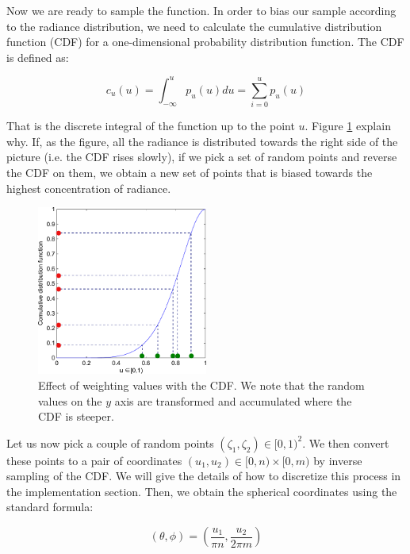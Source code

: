 Now we are ready to sample the function. In order to bias our sample according to the radiance distribution, we need to calculate the cumulative distribution function (CDF) for a one-dimensional probability distribution function. The CDF is defined as:

$$
c_u(u) = \int_{-\infty}^{u} p_u(u) du = \sum_{i=0}^u p_u(u)
$$

That is the discrete integral of the function up to the point $u$. Figure \ref{fig:cdfweight} explain why. If, as the figure, all the radiance is distributed towards the right side of the picture (i.e. the CDF rises slowly), if we pick a set of random points and reverse the CDF on them, we obtain a new set of points that is biased towards the highest concentration of radiance.


\begin{figure}[!ht]
\centering
\includegraphics[width=0.5\textwidth]{images/matlab/cdfex.pdf}
\caption{Effect of weighting values with the CDF. We note that the random values on the $y$ axis are transformed and accumulated where the CDF is steeper.}
\label{fig:cdfweight}
\end{figure}

Let us now pick a couple of random points $(\zeta_1,\zeta_2) \in [0,1)^2$. We then convert these points to a pair of coordinates $(u_1,u_2) \in [0,n)\times[0,m)$ by inverse sampling of the CDF. We will give the details of how to discretize this process in the implementation section. Then, we obtain the spherical coordinates using the standard formula:

$$
(\theta, \phi) = \left(\frac{u_1}{\pi n}, \frac{u_2}{2 \pi m}\right)
$$


